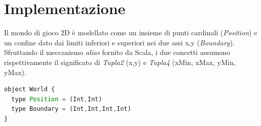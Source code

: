 \documentclass[../main.tex]{subfiles}
\begin{document}
\section{Implementazione}
Il mondo di gioco 2D è modellato come un insieme di punti cardinali (\textit{Position}) e un confine dato dai limiti inferiori e superiori nei due assi x,y (\textit{Boundary}). Sfruttando il meccanismo \textit{alias} fornito da Scala, i due concetti assumono rispettivamente il significato di \textit{Tupla2} (x,y) e \textit{Tupla4} (xMin, xMax, yMin, yMax).
\begin{lstlisting}[language=Javascript, caption=Definizione dei concetti rappresentanti il mondo 2D di gioco tramite \textit{alias}.]
object World {
  type Position = (Int,Int)
  type Boundary = (Int,Int,Int,Int)
}
\end{lstlisting}
\end{document}
